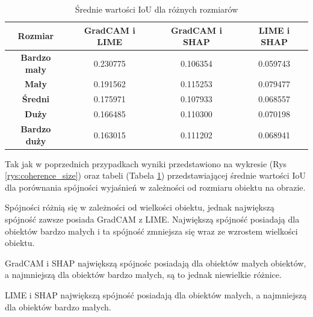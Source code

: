 \begin{table}[h]
	\centering
	\begin{tabular}{|c|c|c|c|}
		\hline
		\textbf{Rozmiar}     & \textbf{GradCAM i LIME} & \textbf{GradCAM i SHAP} & \textbf{LIME i SHAP} \\
		\hline
		\textbf{Bardzo mały} & 0.230775                & 0.106354                & 0.059743             \\
		\hline
		\textbf{Mały}        & 0.191562                & 0.115253                & 0.079477             \\
		\hline
		\textbf{Średni}      & 0.175971                & 0.107933                & 0.068557             \\
		\hline
		\textbf{Duży}        & 0.166485                & 0.110300                & 0.070198             \\
		\hline
		\textbf{Bardzo duży} & 0.163015                & 0.111202                & 0.068941             \\
		\hline
	\end{tabular}
	\caption{Średnie wartości IoU dla różnych rozmiarów}
	\label{tab:base_coherence_size}
\end{table}

Tak jak w poprzednich przypadkach wyniki przedstawiono na wykresie (Rys \ref{rys:coherence_size}) oraz tabeli (Tabela \ref{tab:base_coherence_size}) przedstawiającej średnie wartości IoU dla porównania spójności wyjaśnień w zależności od rozmiaru obiektu na obrazie.

Spójności różnią się w zależności od wielkości obiektu, jednak największą spójność zawsze posiada GradCAM z LIME.
Największą spójność posiadają dla obiektów bardzo małych i ta spójność zmniejsza się wraz ze wzrostem wielkości obiektu.

GradCAM i SHAP największą spójnośc posiadają dla obiektów małych obiektów, a najmniejszą dla obiektów bardzo małych, są to jednak niewielkie różnice.

LIME i SHAP największą spójność posiadają dla obiektów małych, a najmniejszą dla obiektów bardzo małych.

